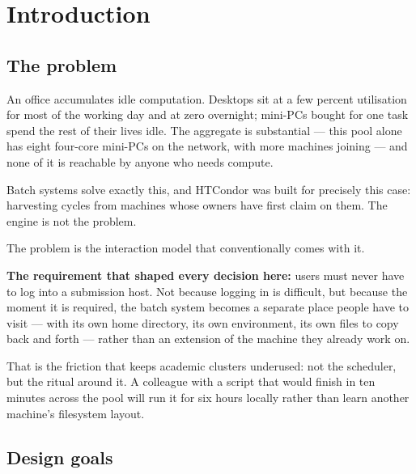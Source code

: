 \chapter{Introduction}
\label{ch:intro}

\section{The problem}

An office accumulates idle computation. Desktops sit at a few percent
utilisation for most of the working day and at zero overnight; mini-PCs bought
for one task spend the rest of their lives idle. The aggregate is substantial
--- this pool alone has eight four-core mini-PCs on the network, with more
machines joining --- and none of it is reachable by anyone who needs compute.

Batch systems solve exactly this, and HTCondor was built for precisely this case:
harvesting cycles from machines whose owners have first claim on them. The
engine is not the problem.

The problem is the interaction model that conventionally comes with it.

\begin{keypoint}
\textbf{The requirement that shaped every decision here:} users must never have
to log into a submission host. Not because logging in is difficult, but because
the moment it is required, the batch system becomes a separate place people have
to visit --- with its own home directory, its own environment, its own files to
copy back and forth --- rather than an extension of the machine they already
work on.
\end{keypoint}

That is the friction that keeps academic clusters underused: not the scheduler,
but the ritual around it. A colleague with a script that would finish in ten
minutes across the pool will run it for six hours locally rather than learn
another machine's filesystem layout.

\section{Design goals}


